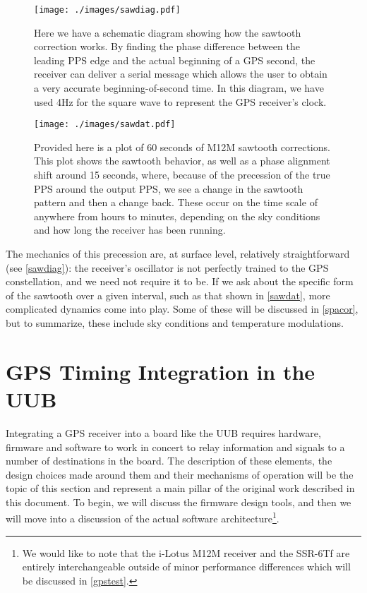 \begin{figure}[h!]
\centering
\texttt{[image: ./images/sawdiag.pdf]}
\caption[Sawtooth Diagram]{Here we have a schematic diagram showing how the sawtooth correction works. By finding the phase difference between the leading PPS edge and the actual beginning of a GPS second, the receiver can deliver a serial message which allows the user to obtain a very accurate beginning-of-second time. In this diagram, we have used 4Hz for the square wave to represent the GPS receiver's clock.}
\label{sawdiag}
\end{figure}
\begin{figure}[h!]
\centering
\texttt{[image: ./images/sawdat.pdf]}
\caption[Sawtooth Data]{Provided here is a plot of 60 seconds of M12M sawtooth corrections. This plot shows the sawtooth behavior, as well as a phase alignment shift around 15 seconds, where, because of the precession of the true PPS around the output PPS, we see a change in the sawtooth pattern and then a change back. These occur on the time scale of anywhere from hours to minutes, depending on the sky conditions and how long the receiver has been running.}
\label{sawdat}
\end{figure}
$\,$\\
The mechanics of this precession are, at surface level, relatively straightforward (see \autoref{sawdiag}): the receiver's oscillator is not perfectly trained to the GPS constellation, and we need not require it to be. If we ask about the specific form of the sawtooth over a given interval, such as that shown in \autoref{sawdat}, more complicated dynamics come into play. Some of these will be discussed in \autoref{spacor}, but to summarize, these include sky conditions and temperature modulations.
\section{GPS Timing Integration in the UUB}
\label{integration}
Integrating a GPS receiver into a board like the UUB requires hardware, firmware and software to work in concert to relay information and signals to a number of destinations in the board. The description of these elements, the design choices made around them and their mechanisms of operation will be the topic of this section and represent a main pillar of the original work described in this document. To begin, we will discuss the firmware design tools, and then we will move into a discussion of the actual software architecture\footnote{We would like to note that the i-Lotus M12M receiver and the SSR-6Tf are entirely interchangeable outside of minor performance differences which will be discussed in \autoref{gpstest}.}.
